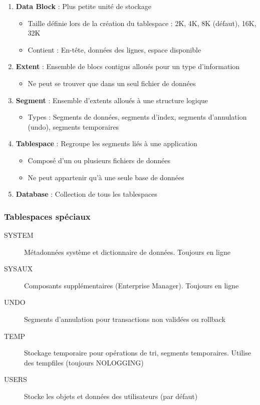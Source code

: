\documentclass[12pt,a4paper]{article}
\begin{document}
\begin{enumerate}
    \item \textbf{Data Block} : Plus petite unité de stockage
    \begin{itemize}
        \item Taille définie lors de la création du tablespace : 2K, 4K, 8K (défaut), 16K, 32K
        \item Contient : En-tête, données des lignes, espace disponible
    \end{itemize}
    
    \item \textbf{Extent} : Ensemble de blocs contigus alloués pour un type d'information
    \begin{itemize}
        \item Ne peut se trouver que dans un seul fichier de données
    \end{itemize}
    
    \item \textbf{Segment} : Ensemble d'extents alloués à une structure logique
    \begin{itemize}
        \item Types : Segments de données, segments d'index, segments d'annulation (undo), segments temporaires
    \end{itemize}
    
    \item \textbf{Tablespace} : Regroupe les segments liés à une application
    \begin{itemize}
        \item Composé d'un ou plusieurs fichiers de données
        \item Ne peut appartenir qu'à une seule base de données
    \end{itemize}
    
    \item \textbf{Database} : Collection de tous les tablespaces
\end{enumerate}

\subsubsection{Tablespaces spéciaux}

\begin{description}
    \item[SYSTEM] Métadonnées système et dictionnaire de données. Toujours en ligne
    
    \item[SYSAUX] Composants supplémentaires (Enterprise Manager). Toujours en ligne
    
    \item[UNDO] Segments d'annulation pour transactions non validées ou rollback
    
    \item[TEMP] Stockage temporaire pour opérations de tri, segments temporaires. Utilise des tempfiles (toujours NOLOGGING)
    
    \item[USERS] Stocke les objets et données des utilisateurs (par défaut)
\end{description}
\end{document}
